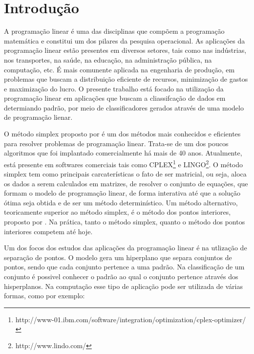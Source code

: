 \chapter{Introdução}

A programação linear é uma das disciplinas que compõem a programação matemática e constitui um dos pilares da pesquisa operacional. As aplicações da programação linear estão presentes em diversos setores, tais como nas indústrias, nos transportes, na saúde, na educação, na administração pública, na computação, etc. É mais comunente aplicada na engenharia de produção, em problemas que buscam a distribuição eficiente de recursos, minimização de gastos e maximização do lucro. O presente trabalho está focado na utilização da programação linear em aplicações que buscam a cliassifcação de dados em determiando padrão, por meio de classificadores gerados através de uma modelo de programação lienar.

O método simplex proposto por  é um dos métodos mais conhecidos e eficientes para resolver problemas de programação linear. Trata-se de um dos poucos algoritmos que foi implantado comercialmente há mais de 40 anos. Atualmente, está presente em softwares comerciais tais como CPLEX\footnote{http://www-01.ibm.com/software/integration/optimization/cplex-optimizer/} e LINGO\footnote{http://www.lindo.com/}. O método simplex tem como principais carcaterísticas o fato de ser matricial, ou seja, aloca os dados a serem calculados em matrizes, de resolver o conjunto de equações, que formam o modelo de programação linear, de forma interativa até que a solução ótima seja obtida e de ser um método determinístico. Um método alternativo, teoricamente superior ao método simplex, é o método dos pontos interiores, proposto por . Na prática, tanto o método simplex, quanto o método dos pontos interiores competem até hoje.  

Um dos focos dos estudos das aplicações da programação linear é na utlização de separação de pontos. O modelo gera um hiperplano que separa conjuntos de pontos, sendo que cada conjunto pertence a uma padrão. Na classificação de um conjunto é possivel conhecer o padrão ao qual o conjunto pertence através dos hisperplanos. Na computação esse tipo de aplicação pode ser utilizada de várias formas, como por exemplo:

